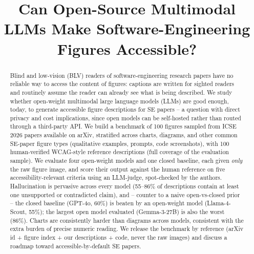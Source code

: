 \documentclass[10pt,conference]{IEEEtran}
\begin{document}
\title{Can Open-Source Multimodal LLMs Make Software-Engineering Figures Accessible?}

\author{
}

\maketitle

\begin{abstract}
Blind and low-vision (BLV) readers of software-engineering research papers have no reliable way to access the content of figures: captions are written for sighted readers and routinely assume the reader can already see what is being described. We study whether open-weight multimodal large language models (LLMs) are good enough, today, to generate accessible figure descriptions for SE papers -- a question with direct privacy and cost implications, since open models can be self-hosted rather than routed through a third-party API. We build a benchmark of 100 figures sampled from ICSE 2026 papers available on arXiv, stratified across charts, diagrams, and other common SE-paper figure types (qualitative examples, prompts, code screenshots), with 100 human-verified WCAG-style reference descriptions (full coverage of the evaluation sample). We evaluate four open-weight models and one closed baseline, each given \emph{only} the raw figure image, and score their output against the human reference on five accessibility-relevant criteria using an LLM-judge, spot-checked by the authors. Hallucination is pervasive across every model (55--86\% of descriptions contain at least one unsupported or contradicted claim), and -- counter to a naive open-vs-closed prior -- the closed baseline (GPT-4o, 60\%) is beaten by an open-weight model (Llama-4-Scout, 55\%); the largest open model evaluated (Gemma-3-27B) is also the worst (86\%). Charts are consistently harder than diagrams across models, consistent with the extra burden of precise numeric reading. We release the benchmark by reference (arXiv id + figure index + our descriptions + code, never the raw images) and discuss a roadmap toward accessible-by-default SE papers.
\end{abstract}
\end{document}
